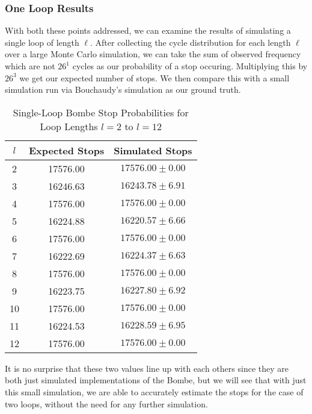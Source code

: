 \subsubsection{One Loop Results}
With both these points addressed, we can examine the results of simulating a single loop of length $\ell$. After collecting the cycle distribution for each length $\ell$ over a large Monte Carlo simulation, we can take the sum of observed frequency which are not $26^1$ cycles as our probability of a stop occuring. Multiplying this by $26^3$ we get our expected number of stops. We then compare this with a small simulation run via Bouchaudy's simulation as our ground truth. 
\begin{table}[H]
\centering

\begin{tabular}{|c|c|c|}
\hline
{\bf{ $l$ }} & {\bf{ Expected Stops }} & {\bf{ Simulated Stops }}\\
\hline
2 & 17576.00 & $17576.00 \pm 0.00$\\
\hline
3 & 16246.63 & $16243.78 \pm 6.91$\\
\hline
4 & 17576.00 & $17576.00 \pm 0.00$\\
\hline
5 & 16224.88 & $16220.57 \pm 6.66$\\
\hline
6 & 17576.00 & $17576.00 \pm 0.00$\\
\hline
7 & 16222.69 & $16224.37 \pm 6.63$\\
\hline
8 & 17576.00 & $17576.00 \pm 0.00$\\
\hline
9 & 16223.75 & $16227.80 \pm 6.92$\\
\hline
10 & 17576.00 & $17576.00 \pm 0.00$\\
\hline
11 & 16224.53 & $16228.59 \pm 6.95$\\
\hline
12 & 17576.00 & $17576.00 \pm 0.00$\\
\hline
\end{tabular}
\caption{Single-Loop Bombe Stop Probabilities for Loop Lengths $l=2$ to $l=12$}
\end{table}
\noindent It is no surprise that these two values line up with each others since they are both just simulated implementations of the Bombe, but we will see that with just this small simulation, we are able to accurately estimate the stops for the case of two loops, without the need for any further simulation.
